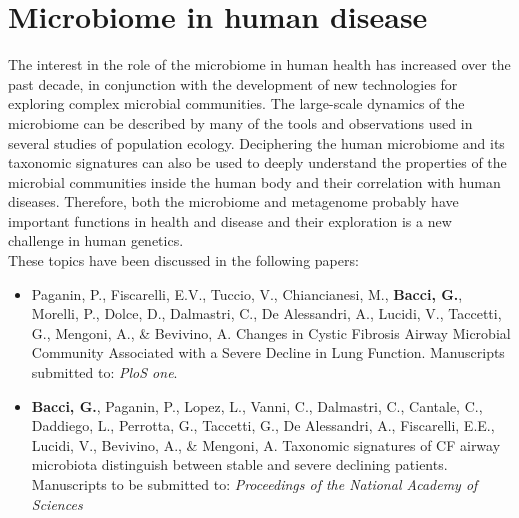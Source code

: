 \logvartrue
\chapter{Microbiome in human disease}
The interest in the role of the microbiome in human health has increased over the past decade, in conjunction with the development of new technologies for exploring complex microbial communities. The large-scale dynamics of the microbiome can be described by many of the tools and observations used in several studies of population ecology. Deciphering the human microbiome and its taxonomic signatures can also be used to deeply understand the properties of the microbial communities inside the human body and their correlation with human diseases. Therefore, both the microbiome and metagenome probably have important functions in health and disease and their exploration is a new challenge in human genetics.\\
These topics have been discussed in the following papers:
\vspace{-2mm}
\begin{itemize}
\item Paganin, P., Fiscarelli, E.V., Tuccio, V., Chiancianesi, M., \textbf{Bacci, G.}, Morelli, P., Dolce, D., Dalmastri, C., De Alessandri, A., Lucidi, V., Taccetti, G., Mengoni, A., \& Bevivino, A. Changes in Cystic Fibrosis Airway Microbial Community Associated with a Severe Decline in Lung Function. Manuscripts submitted to: \textit{PloS one}.
\item \textbf{Bacci, G.}, Paganin, P., Lopez, L., Vanni, C., Dalmastri, C., Cantale, C., Daddiego, L., Perrotta, G., Taccetti, G., De Alessandri, A., Fiscarelli, E.E., Lucidi, V., Bevivino, A., \& Mengoni, A. Taxonomic signatures of CF airway microbiota distinguish between stable and severe declining patients. Manuscripts to be  submitted to: \textit{Proceedings of the National Academy of Sciences}
\end{itemize}

